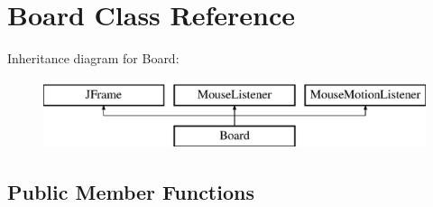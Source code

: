 \hypertarget{class_board}{\section{Board Class Reference}
\label{class_board}
}
Inheritance diagram for Board\-:\begin{figure}[H]
\begin{center}
\leavevmode
\includegraphics[height=2.000000cm]{class_board}
\end{center}
\end{figure}
\subsection*{Public Member Functions}
